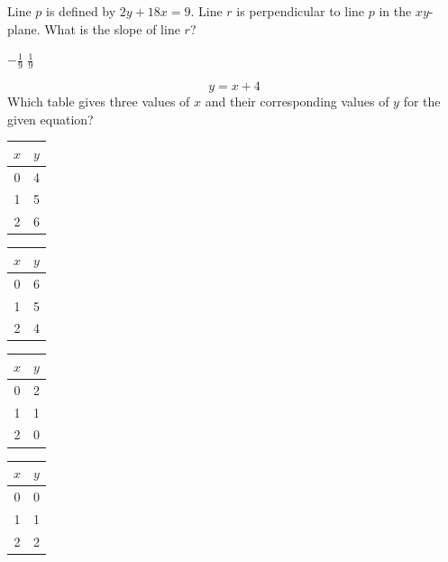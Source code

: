 \question[1]
Line $p$ is defined by $2y + 18x = 9$. Line $r$ is perpendicular to line $p$ in the $xy$-plane. What is the slope of line $r$?
\begin{choices}
  \choice $-\frac{1}{9}$
  \CorrectChoice $\frac{1}{9}$
\end{choices}

\question[1]
$$y=x+4$$
Which table gives three values of $x$ and their corresponding values of $y$ for the given equation?
\phantom{\space}\\
\begin{oneparchoices}
  \CorrectChoice \parbox[t][1.35in][t]{0.38\linewidth}{\centering
    \begin{tabular}{|c|c|}
    \hline
    $x$ & $y$ \\
    \hline
    0 & 4 \\
    \hline
    1 & 5 \\
    \hline
    2 & 6 \\
    \hline
    \end{tabular}}
  \choice \parbox[t][1.35in][t]{0.38\linewidth}{\centering
    \begin{tabular}{|c|c|}
    \hline
    $x$ & $y$ \\
    \hline
    0 & 6 \\
    \hline
    1 & 5 \\
    \hline
    2 & 4 \\
    \hline
    \end{tabular}}
  \choice \parbox[t][1.35in][t]{0.38\linewidth}{\centering
    \begin{tabular}{|c|c|}
    \hline
    $x$ & $y$ \\
    \hline
    0 & 2 \\
    \hline
    1 & 1 \\
    \hline
    2 & 0 \\
    \hline
    \end{tabular}}
  \choice \parbox[t][1.35in][t]{0.38\linewidth}{\centering
    \begin{tabular}{|c|c|}
    \hline
    $x$ & $y$ \\
    \hline
    0 & 0 \\
    \hline
    1 & 1 \\
    \hline
    2 & 2 \\
    \hline
    \end{tabular}}
\end{oneparchoices}

\newpage



